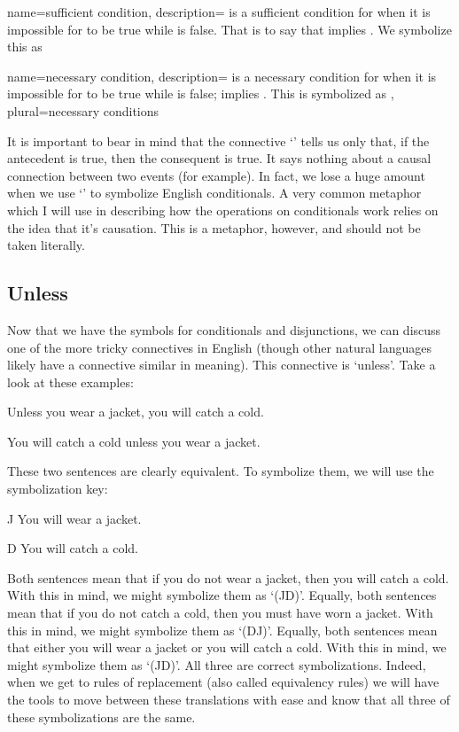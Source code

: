{
name=sufficient condition,
description={ is a sufficient condition for  when it is impossible for  to be true while  is false. That is to say that  implies . We symbolize this as \eif{}}
}

{
name=necessary condition,
description={ is a necessary condition for  when it is impossible for  to be true while  is false;  implies . This is symbolized as \eif{}},
plural=necessary conditions
} 

It is important to bear in mind that the connective ‘\eif’ tells us only that, if the antecedent is true, then the consequent is true. It says nothing about a causal connection between two events (for example). In fact, we lose a huge amount when we use ‘\eif’ to symbolize English conditionals. A very common metaphor which I will use in describing how the operations on conditionals work relies on the idea that it's causation. This is a metaphor, however, and should not be taken literally. 
\subsection{Unless}
Now that we have the symbols for conditionals and disjunctions, we can discuss one of the more tricky connectives in English (though other natural languages likely have a connective similar in meaning). This connective is ‘unless'. Take a look at these examples:
\begin{earg}
\item[\ex{unless1}] Unless you wear a jacket, you will catch a cold.
\item[\ex{unless2}] You will catch a cold unless you wear a jacket.
\end{earg}
These two sentences are clearly equivalent. To symbolize them, we will use the symbolization key:
	\begin{ekey}
		\item[J] You will wear a jacket.
		\item[D] You will catch a cold.
	\end{ekey}
Both sentences mean that if you do not wear a jacket, then you will catch a cold. With this in mind, we might symbolize them as ‘(\enot J\eif D)’. Equally, both sentences mean that if you do not catch a cold, then you must have worn a jacket. With this in mind, we might symbolize them as ‘(\enot D\eif J)’.
Equally, both sentences mean that either you will wear a jacket or you will catch a cold. With this in mind, we might symbolize them as ‘(J\eor D)’.
All three are correct symbolizations. Indeed, when we get to rules of replacement (also called equivalency rules) we will have the tools to move between these translations with ease and know that all three of these symbolizations are the same.

